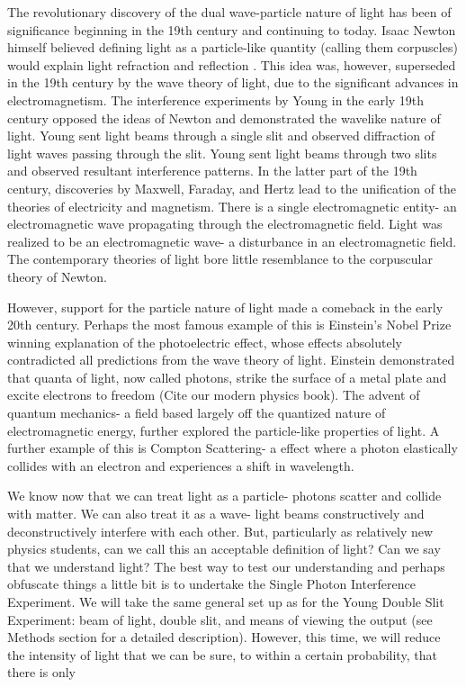 \documentclass[prb,preprint]{revtex4-1}
\begin{document}
The revolutionary discovery of the dual wave-particle nature of light has been of significance beginning in the 19th century and continuing to today.  Isaac Newton himself believed defining light as a particle-like quantity (calling them corpuscles) would explain light refraction and reflection \cite{newton}.  This idea was, however, superseded in the 19th century by the wave theory of light, due to the significant advances in electromagnetism.  The interference experiments by Young in the early 19th century opposed the ideas of Newton and demonstrated the wavelike nature of light.  Young sent light beams through a single slit and observed diffraction of light waves passing through the slit.  Young sent light beams through two slits and observed resultant interference patterns.  In the latter part of the 19th century, discoveries by Maxwell, Faraday, and Hertz lead to the unification of the theories of electricity and magnetism.  There is a single electromagnetic entity- an electromagnetic wave propagating through the electromagnetic field.  Light was realized to be an electromagnetic wave- a disturbance in an electromagnetic field.  The contemporary theories of light bore little resemblance to the corpuscular theory of Newton.  \cite{david}

However, support for the particle nature of light made a comeback in the early 20th century.  Perhaps the most famous example of this is Einstein's Nobel Prize winning explanation of the photoelectric effect, whose effects absolutely contradicted all predictions from the wave theory of light.  Einstein demonstrated that quanta of light, now called photons, strike the surface of a metal plate and excite electrons to freedom (Cite our modern physics book).  The advent of quantum mechanics- a field based largely off the quantized nature of electromagnetic energy, further explored the particle-like properties of light.  A further example of this is Compton Scattering- a effect where a photon elastically collides with an electron and experiences a shift in wavelength.  

We know now that we can treat light as a particle- photons scatter and collide with matter.  We can also treat it as a wave- light beams constructively and deconstructively interfere with each other.  But, particularly as relatively new physics students, can we call this an acceptable definition of light?  Can we say that we understand light?  The best way to test our understanding and perhaps obfuscate things a little bit is to undertake the Single Photon Interference Experiment.  We will take the same general set up as for the Young Double Slit Experiment:  beam of light, double slit, and means of viewing the output (see Methods section for a detailed description).  However, this time, we will reduce the intensity of light that we can be sure, to within a certain probability, that there is only 
\end{document}
